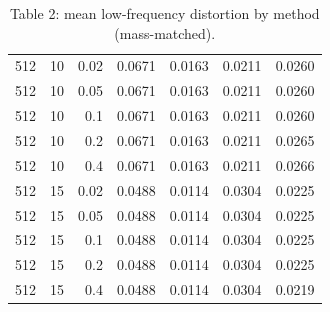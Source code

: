 \begin{table}[t]
\begin{tabular}{lrrrrrr}
512 & 10 & 0.02 & 0.0671 & 0.0163 & 0.0211 & 0.0260 \\
512 & 10 & 0.05 & 0.0671 & 0.0163 & 0.0211 & 0.0260 \\
512 & 10 & 0.1 & 0.0671 & 0.0163 & 0.0211 & 0.0260 \\
512 & 10 & 0.2 & 0.0671 & 0.0163 & 0.0211 & 0.0265 \\
512 & 10 & 0.4 & 0.0671 & 0.0163 & 0.0211 & 0.0266 \\
512 & 15 & 0.02 & 0.0488 & 0.0114 & 0.0304 & 0.0225 \\
512 & 15 & 0.05 & 0.0488 & 0.0114 & 0.0304 & 0.0225 \\
512 & 15 & 0.1 & 0.0488 & 0.0114 & 0.0304 & 0.0225 \\
512 & 15 & 0.2 & 0.0488 & 0.0114 & 0.0304 & 0.0225 \\
512 & 15 & 0.4 & 0.0488 & 0.0114 & 0.0304 & 0.0219 \\
\hline
\end{tabular}
\caption{Table 2: mean low-frequency distortion by method (mass-matched).}
\end{table}

